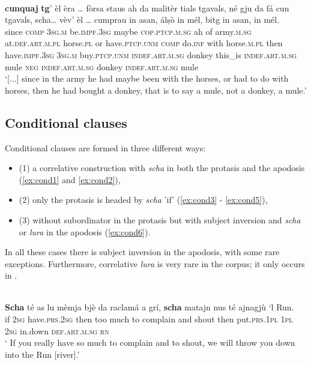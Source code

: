 \ea
\label{ex:caus7}
\\ 
\gll [...] \textbf{cunquaj} \textbf{tg}' èl èra … fòrsa staus ah da malitèr tials tgavals, né gju da fá cun tgavals, scha… vèv’ èl … cumprau in asan, álṣò in mél, bitg in asan, in mél.\\
{} since \textsc{comp} \textsc{3sg.m} be.\textsc{impf.3sg} {} maybe \textsc{cop.ptcp.m.sg} ah  of army.\textsc{m.sg} at.\textsc{def.art.m.pl} horse.\textsc{pl} or have.\textsc{ptcp.unm}  \textsc{comp} do.\textsc{inf} with horse.\textsc{m.pl} then have.\textsc{impf.3sg} \textsc{3sg.m} {}  buy.\textsc{ptcp.unm}  \textsc{indef.art.m.sg} donkey this\_is \textsc{indef.art.m.sg} mule \textsc{neg} \textsc{indef.art.m.sg} donkey \textsc{indef.art.m.sg} mule \\
\glt `[...] since in the army he had maybe been with the horses, or had to do with horses, then he had bought a donkey, that is to say a mule, not a donkey, a mule.'
\z

\subsection{Conditional clauses}
Conditional clauses are formed in three different ways:

\begin{itemize}
	\item (1) a correlative construction with \textit{scha} in both the protasis and the apodosis (\ref{ex:cond1} and \ref{ex:cond2}), 
	\item (2) only the protasis is headed by \textit{scha} 'if' (\ref{ex:cond3} - \ref{ex:cond5}),
	\item (3) without subordinator in the protasis but with subject inversion and \textit{scha} or \textit{lura} in the apodosis (\ref{ex:cond6}).
\end{itemize}


In all these cases there is subject inversion in the apodosis, with some rare exceptions. Furthermore, correlative \textit{lura} is very rare in the corpus; it only occurs in \citet{Büchli1966}.

\ea
\label{ex:cond1}
\\
\gll \textbf{Scha} té as lu mèmja bjè da raclamá a grí, \textbf{scha} matajn nus té ajnagjù ‘l Run.\\
if \textsc{2sg} have.\textsc{prs.2sg} then too much to complain and shout then put.\textsc{prs.1pl} \textsc{1pl} \textsc{2sg} in.down \textsc{def.art.m.sg} \textsc{rn}\\
\glt ` If you really have so much to complain and to shout, we will throw you down into the Run [river].'
\z


